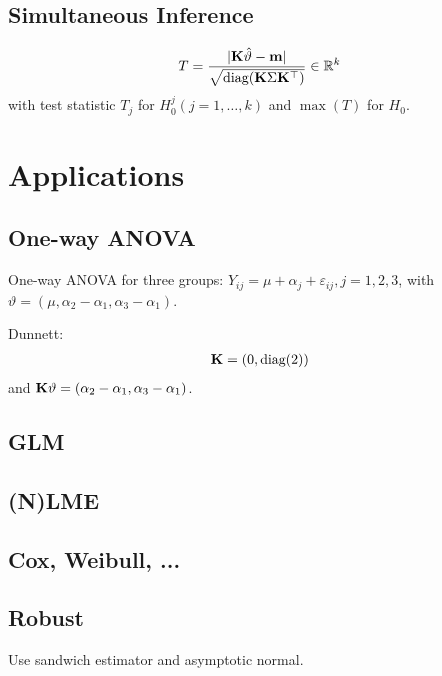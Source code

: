 \documentclass{article}
\begin{document}
\subsection{Simultaneous Inference}

\begin{eqnarray*}
T = \frac{|\mathbf{K} \hat{\vartheta} - \mathbf{m}|}{\sqrt{\text{diag}(\mathbf{K} \Sigma \mathbf{K}^\top)}} \in \mathbb{R}^k
\end{eqnarray*}
with test statistic $T_j$ for $H_0^j (j = 1, \dots, k)$ and $\max(T)$ for $H_0$.

\section{Applications}

\subsection{One-way ANOVA}

One-way ANOVA for three groups:
$Y_{ij} = \mu + \alpha_{j} + \varepsilon_{ij}, j = 1, 2, 3$,
with $\vartheta = (\mu, \alpha_2 - \alpha_1, \alpha_3 - \alpha_1)$.

Dunnett: 
\begin{eqnarray*}
\mathbf{K} = (0, \text{diag}(2))
\end{eqnarray*}
and $\mathbf{K} \vartheta = (\alpha_2 - \alpha_1, \alpha_3 - \alpha_1)$.

\subsection{GLM}

\subsection{(N)LME}

\subsection{Cox, Weibull, ...}

\subsection{Robust}

Use sandwich estimator and asymptotic normal.
\end{document}
